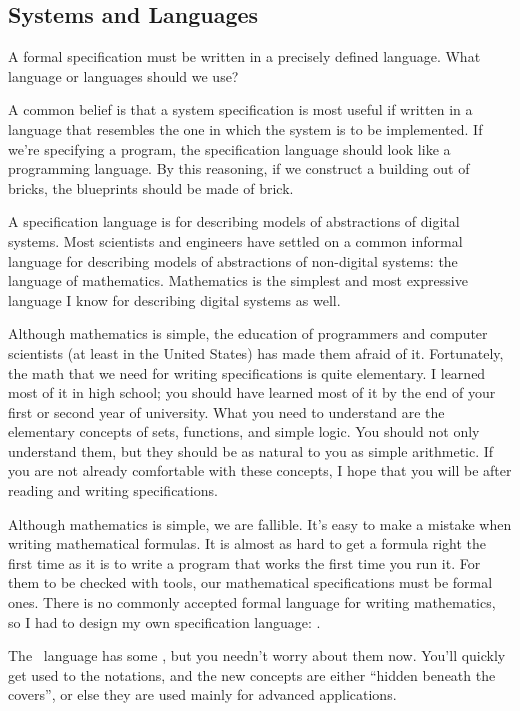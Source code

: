 \documentclass[fleqn,leqno]{article}
\begin{document}

\subsection{Systems and Languages}

A formal specification must be written in a precisely defined
language.  What language or languages should we use?

A common belief is that a system specification is most useful if 
written in a language that resembles the one in which the system is to
be implemented.  If we're specifying a program, the specification
language should look like a programming language.  By this reasoning,
if we construct a building out of bricks, the blueprints should be
made of brick.

A specification language is for describing models of abstractions of
digital systems.  Most scientists and engineers have settled on a
common informal language for describing models of abstractions of
non-digital systems: the language of mathematics.  Mathematics is the
simplest and most expressive language I know for describing digital
systems as well.  

Although mathematics is simple, the education of programmers and
computer scientists (at least in the United States) has made them
afraid of it.  Fortunately, the math that we need for writing
specifications is quite elementary.  I learned most of it in high
school; you should have learned most of it by the end of your first or
second year of university.  What you need to understand are the
elementary concepts of sets, functions, and simple logic.  You should
not only understand them, but they should be as natural to you as
simple arithmetic.  If you are not already comfortable with these
concepts, I hope that you will be after reading and writing
specifications.

Although mathematics is simple, we are fallible.  It's easy to make a
mistake when writing mathematical formulas.  It is almost as hard to
get a formula right the first time as it is to write a program that
works the first time you run it.  For them to be checked with tools,
our mathematical specifications must be formal ones.  There is no
commonly accepted formal language for writing mathematics, so I had to
design my own specification language: \tlaplus.

The \tlaplus\ language has some 
, but you needn't worry about them now.  You'll quickly get used
to the notations, and the new concepts are either ``hidden beneath the
covers'', or else they are used mainly for advanced applications.
\end{document}
